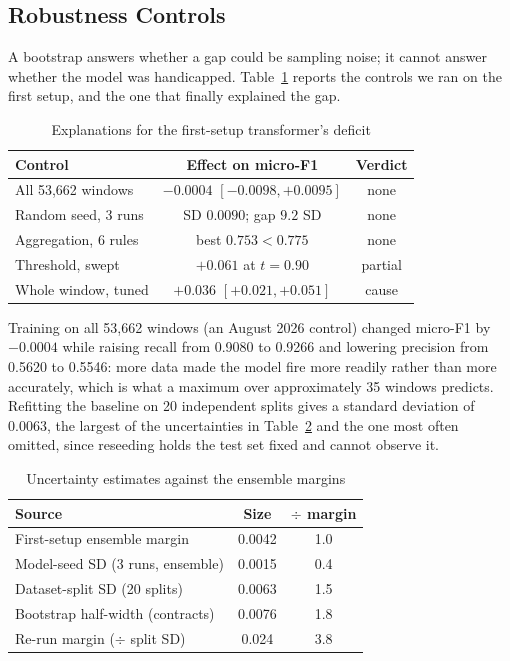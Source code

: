 \documentclass[journal]{IEEEtran}
\begin{document}
\subsection{Robustness Controls}
\label{sec:controls}
A bootstrap answers whether a gap could be sampling noise; it cannot answer whether the model was
handicapped. Table~\ref{tab:controls} reports the controls we ran on the first setup, and the one
that finally explained the gap.

\begin{table}[!t]
\caption{Explanations for the first-setup transformer's deficit}
\label{tab:controls}
\centering
\small
\setlength{\tabcolsep}{3pt}
\begin{tabular}{lcc}
\toprule
\textbf{Control} & \textbf{Effect on micro-F1} & \textbf{Verdict}\\
\midrule
All 53,662 windows   & $-0.0004$ $[-0.0098,+0.0095]$ & none\\
Random seed, 3 runs  & SD $0.0090$; gap $9.2$ SD   & none\\
Aggregation, 6 rules & best $0.753 < 0.775$        & none\\
Threshold, swept     & $+0.061$ at $t{=}0.90$      & partial\\
\midrule
Whole window, tuned  & $+0.036$ $[+0.021,+0.051]$  & cause\\
\bottomrule
\end{tabular}
\end{table}

Training on all 53,662 windows (an August 2026 control) changed micro-F1 by $-0.0004$ while raising
recall from 0.9080 to 0.9266 and lowering precision from 0.5620 to 0.5546: more data made the model fire
more readily rather than more accurately, which is what a maximum over approximately 35 windows
predicts. Refitting the baseline on 20 independent splits gives a standard deviation of 0.0063, the
largest of the uncertainties in Table~\ref{tab:var} and the one most often omitted, since reseeding
holds the test set fixed and cannot observe it.

\begin{table}[!t]
\caption{Uncertainty estimates against the ensemble margins}
\label{tab:var}
\centering
\small
\setlength{\tabcolsep}{4pt}
\begin{tabular}{lcc}
\toprule
\textbf{Source} & \textbf{Size} & \textbf{$\div$ margin}\\
\midrule
First-setup ensemble margin      & 0.0042 & 1.0\\
Model-seed SD (3 runs, ensemble) & 0.0015 & 0.4\\
Dataset-split SD (20 splits)     & 0.0063 & 1.5\\
Bootstrap half-width (contracts) & 0.0076 & 1.8\\
\midrule
Re-run margin ($\div$ split SD)  & 0.024  & 3.8\\
\bottomrule
\end{tabular}
\end{table}
\end{document}
